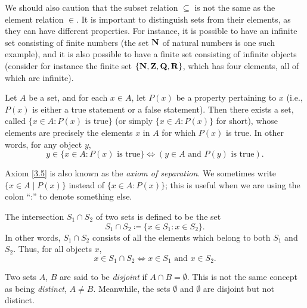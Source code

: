 \begin{remark}\label{3.1.21}
    We should also caution that the subset relation \(\subseteq\) is not the same as the element relation \(\in\).
    It is important to distinguish sets from their elements, as they can have different properties.
    For instance, it is possible to have an infinite set consisting of finite numbers (the set \(\mathbf{N}\) of natural numbers is one such example), and it is also possible to have a finite set consisting of infinite objects
    (consider for instance the finite set \(\{\mathbf{N}, \mathbf{Z}, \mathbf{Q}, \mathbf{R}\}\), which has four elements, all of which are infinite).
\end{remark}

\begin{axiom}\label{3.5}
    Let \(A\) be a set, and for each \(x \in A\), let \(P(x)\) be a property pertaining to \(x\) (i.e., \(P(x)\) is either a true statement or a false statement).
    Then there exists a set, called \(\{x \in A : P(x) \text{ is true}\}\) (or simply \(\{x \in A : P(x)\}\) for short), whose elements are precisely the elements \(x\) in \(A\) for which \(P(x)\) is true.
    In other words, for any object \(y\),
    \[
        y \in \{x \in A : P(x) \text{ is true}\} \iff (y \in A \text{ and } P(y) \text{ is true}).
    \]
\end{axiom}

\begin{note}
    Axiom \ref{3.5} is also known as the \emph{axiom of separation}.
    We sometimes write \(\{x \in A \mid P(x)\}\) instead of \(\{x \in A : P(x)\}\);
    this is useful when we are using the colon ``:'' to denote something else.
\end{note}

\setcounter{theorem}{22}
\begin{definition}[Intersections]\label{3.1.23}
    The intersection \(S_1 \cap S_2\) of two sets is defined to be the set
    \[
        S_1 \cap S_2 \coloneqq \{x \in S_1 : x \in S_2\}.
    \]
    In other words, \(S_1 \cap S_2\) consists of all the elements which belong to both \(S_1\) and \(S_2\).
    Thus, for all objects \(x\),
    \[
        x \in S_1 \cap S_2 \iff x \in S_1 \text{ and } x \in S_2.
    \]
\end{definition}

\begin{note}
    Two sets \(A\), \(B\) are said to be \emph{disjoint} if \(A \cap B = \emptyset\).
    This is not the same concept as being \emph{distinct}, \(A \neq B\).
    Meanwhile, the sets \(\emptyset\) and \(\emptyset\) are disjoint but not distinct.
\end{note}

